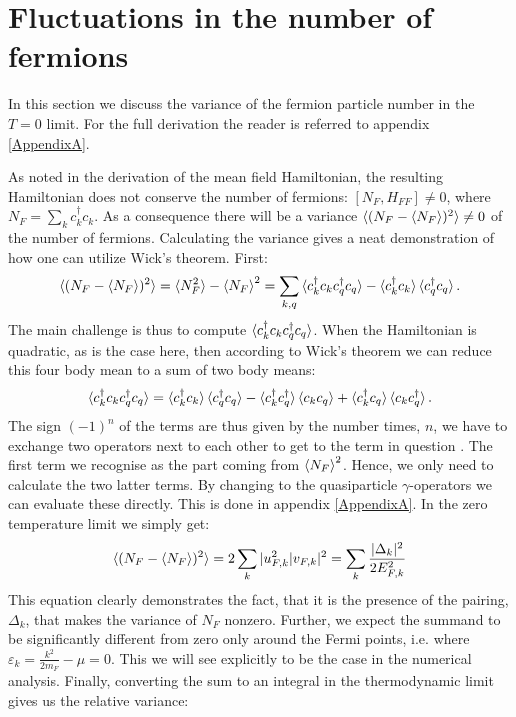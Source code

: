 \section{Fluctuations in the number of fermions}
In this section we discuss the variance of the fermion particle number in the $T = 0$ limit. For the full derivation the reader is referred to appendix \ref{AppendixA}.

As noted in the derivation of the mean field Hamiltonian, the resulting Hamiltonian does not conserve the number of fermions: $[N_F, H_{FF}] \neq 0 $, where $N_F = \sum_k c^\dagger_k c_k$. As a consequence there will be a variance $\braket{(N_F-\braket{N_F})^2} \neq 0$ of the number of fermions. Calculating the variance gives a neat demonstration of how one can utilize Wick's theorem. First:
\begin{equation}
\braket{(N_F-{\braket{N_F}})^2} = \braket{N_F^2} - \braket{N_F}^2 = \sum_{k,q} \braket{c^\dagger_kc_kc^\dagger_qc_q} - \braket{c^\dagger_kc_k}\braket{c^\dagger_qc_q}. \nonumber
\end{equation} 
The main challenge is thus to compute $\braket{c^\dagger_kc_kc^\dagger_qc_q}$. When the Hamiltonian is quadratic, as is the case here, then according to Wick's theorem we can reduce this four body mean to a sum of two body means:
\begin{equation}
\braket{c^\dagger_kc_kc^\dagger_qc_q} = \braket{c^\dagger_kc_k}\braket{c^\dagger_qc_q} - \braket{c^\dagger_kc^\dagger_q}\braket{c_kc_q} + \braket{c^\dagger_kc_q}\braket{c_kc^\dagger_q}. \nonumber
\end{equation}
The sign $(-1)^{n}$ of the terms are thus given by the number times, $n$, we have to exchange two operators next to each other to get to the term in question \cite[pp. 170-174]{BruusFlensberg}. The first term we recognise as the part coming from $\braket{N_F}^2$. Hence, we only need to calculate the two latter terms. By changing to the quasiparticle $\gamma$-operators we can evaluate these directly. This is done in appendix \ref{AppendixA}. In the zero temperature limit we simply get:
\begin{equation}
\braket{(N_F-{\braket{N_F}})^2} = 2\sum_k |u_{F,k}^2|v_{F,k}|^2 = \sum_k \frac{|\Delta_k|^2}{2E^2_{F,k}}
\end{equation}
This equation clearly demonstrates the fact, that it is the presence of the pairing, $\Delta_k$, that makes the variance of $N_F$ nonzero. Further, we expect the summand to be significantly different from zero only around the Fermi points, i.e. where $\varepsilon_k = \frac{k^2}{2m_F} - \mu = 0$. This we will see explicitly to be the case in the numerical analysis. Finally, converting the sum to an integral in the thermodynamic limit gives us the relative variance:
